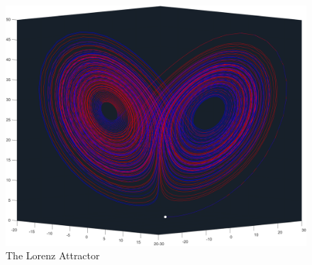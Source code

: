 \documentclass[14pts]{article}
\begin{document}
    \begin{figure}[h]
        \centering
        \includegraphics[width = \textwidth]{Images/Lorenz_Attractor.png}
        \caption{The Lorenz Attractor}
        \label{fig:LorenzAttractor}
    \end{figure}

    \pagebreak
    \nocite{*}
    
    
\end{document}
